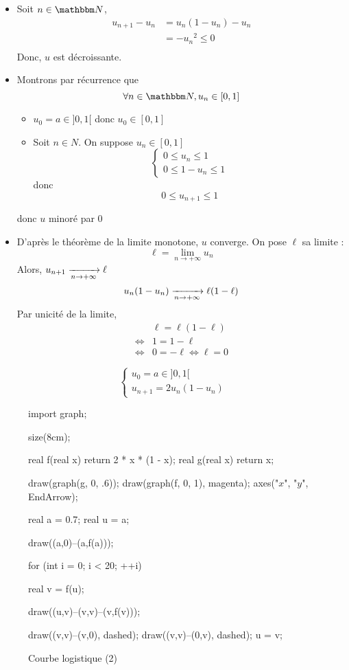 \begin{exm}
		\begin{itemize}
			\item Soit $n\in \N$, 
				\begin{align*}
					u_{n+1} - u_n &= u_n (1-u_n) - u_n\\
					&= -{u_n}^2 \le 0 \\
				\end{align*}
				Donc, $u$ est décroissante.
			\item Montrons par récurrence que \[
				\forall n\in \N, u_n \in [0,1]
				\]
				\begin{itemize}
					\item $u_0 = a \in ]0,1[$ donc $u_0\in [0,1]$
					\item Soit $n\in N$. On suppose $u_n \in [0,1]$ \[
					\begin{cases}
						0 \le  u_n \le 1\\
						0 \le 1-u_n\le 1
					\end{cases}
					\] donc \[
					0 \le u_{n+1} \le 1
					\] 
				\end{itemize}
				donc $u$ minoré par $0$
			\item D'après le théorème de la limite monotone, $u$ converge. On pose $\ell$ sa limite : \[
			\ell=\lim_{n \to +\infty} u_n
			\] Alors, $u_{n+1} \xrightarrow[n\to +\infty]{} \ell$
			\[
				u_n(1-u_n) \xrightarrow[n\to +\infty]{} \ell(1-\ell)
			\]
			Par unicité de la limite, 
			\begin{align*}
				&\ell = \ell(1-\ell)\\
				\iff& 1= 1-\ell \\
				\iff& 0 = -\ell \iff \ell = 0
			\end{align*}
		\end{itemize}
\end{exm}

\begin{exm}
	\[
	\begin{cases}
		u_0 = a \in ]0,1[\\
		u_{n+1} = 2u_n(1-u_n)
	\end{cases}
	\]
	\begin{figure}[H]
		\begin{center}
			\begin{asy}
				import graph;

				size(8cm);

				real f(real x) {return 2 * x * (1 - x); }
				real g(real x) {return x;}

				draw(graph(g, 0, .6));
				draw(graph(f, 0, 1), magenta);
				axes("$x$", "$y$", EndArrow);

				real a = 0.7;
				real u = a;

				draw((a,0)--(a,f(a)));

				for (int i = 0; i < 20; ++i) {
					real v = f(u);

					draw((u,v)--(v,v)--(v,f(v)));

					draw((v,v)--(v,0), dashed);
					draw((v,v)--(0,v), dashed);
					u = v;
				}
			\end{asy}
		\end{center}
		\caption{Courbe logistique (2)}
	 	\label{logistique-curve2}
	\end{figure}
\end{exm}


